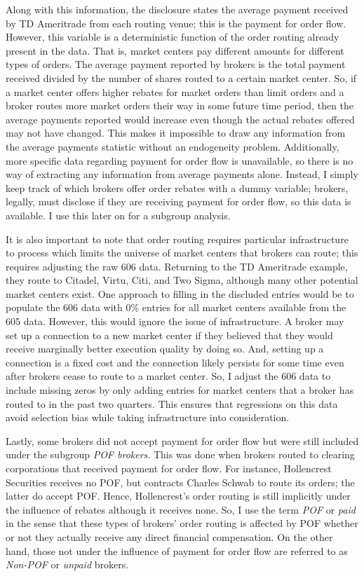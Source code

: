 \documentclass[12pt,a4paper]{article}
\begin{document}
		Along with this information, the disclosure states the average payment received by TD Ameritrade from each routing venue; this is the payment for order flow. However, this variable is a deterministic function of the order routing already present in the data. That is, market centers pay different amounts for different types of orders. The average payment reported by brokers is the total payment received divided by the number of shares routed to a certain market center. So, if a market center offers higher rebates for market orders than limit orders and a broker routes more market orders their way in some future time period, then the average payments reported would increase even though the actual rebates offered may not have changed. This makes it impossible to draw any information from the average payments statistic without an endogeneity problem. Additionally, more specific data regarding payment for order flow is unavailable, so there is no way of extracting any information from average payments alone. Instead, I simply keep track of which brokers offer order rebates with a dummy variable; brokers, legally, must disclose if they are receiving payment for order flow, so this data is available. I use this later on for a subgroup analysis. 
		
		It is also important to note that order routing requires particular infrastructure to process which limits the universe of market centers that brokers can route; this requires adjusting the raw 606 data. Returning to the TD Ameritrade example, they route to Citadel, Virtu, Citi, and Two Sigma, although many other potential market centers exist. One approach to filling in the discluded entries would be to populate the 606 data with 0\% entries for all market centers available from the 605 data. However, this would ignore the issue of infrastructure. A broker may set up a connection to a new market center if they believed that they would receive marginally better execution quality by doing so. And, setting up a connection is a fixed cost and the connection likely persists for some time even after brokers cease to route to a market center. So, I adjust the 606 data to include missing zeros by only adding entries for market centers that a broker has routed to in the past two quarters. This ensures that regressions on this data avoid selection bias while taking infrastructure into consideration. 
		
		Lastly, some brokers did not accept payment for order flow but were still included under the subgroup \textit{POF brokers}. This was done when brokers routed to clearing corporations that received payment for order flow. For instance, Hollencrest Securities receives no POF, but contracts Charles Schwab to route its orders; the latter do accept POF. Hence, Hollencrest's order routing is still implicitly under the influence of rebates although it receives none. So, I use the term \textit{POF} or \textit{paid} in the sense that these types of brokers' order routing is affected by POF whether or not they actually receive any direct financial compensation. On the other hand, those not under the influence of payment for order flow are referred to as \textit{Non-POF} or \textit{unpaid} brokers. 
		
\end{document}
